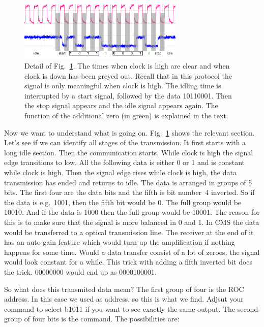 \begin{figure}[h]
    \begin{center}
	\includegraphics[width=0.7\textwidth]{img/tut_scope3_crop.pdf}
	\caption{Detail of Fig.~\ref{fig:tut_scope3}. The times when clock is high are clear and when clock is down has been greyed out. Recall that in this protocol the signal is only meaningful when clock is high. The idling time is interrupted by a start signal, followed by the data 10110001. Then the stop signal appears and the idle signal appears again. The function of the additional zero (in green) is explained in the text.}
	\label{fig:tut_scope3}
    \end{center}
\end{figure}

Now we want to understand what is going on. Fig.~\ref{fig:tut_scope3} shows the relevant section. Let's see if we can identify all stages of the transmission. It first starts with a long idle section. Then the communication starts. While clock is high the signal edge transitions to low. All the following data is either 0 or 1 and is constant while clock is high. Then the signal edge rises while clock is high, the data transmission has ended and returns to idle. The data is arranged in groups of 5 bits. The first four are the data bits and the fifth is bit number~4 inverted. So if the data is e.g.~1001, then the fifth bit would be 0. The full group would be 10010. And if the data is 1000 then the full group would be 10001. The reason for this is to make sure that the signal is more balanced in 0 and 1. In CMS the data would be transferred to a optical transmission line. The receiver at the end of it has an auto-gain feature which would turn up the amplification if nothing happens for some time. Would a data transfer consist of a lot of zeroes, the signal would look constant for a while. This trick with adding a fifth inverted bit does the trick. 00000000 would end up as 0000100001.

So what does this transmited data mean? The first group of four is the ROC address. In this case we used  as address, so this is what we find. Adjsut your  command to select b1011 if you want to see exactly the same output. The second group of four bits is the command. The possibilities are:

